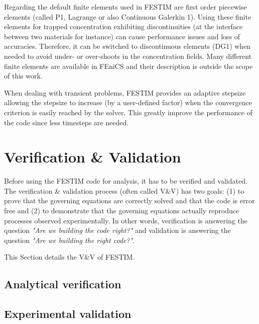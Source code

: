 Regarding the default finite elements used in FESTIM are first order piecewise elements (called P1, Lagrange or also Continuous Galerkin 1).
Using these finite elements for trapped concentration exhibiting discontinuities (at the interface between two materials for instance) can cause performance issues and loss of accuracies.
Therefore, it can be switched to discontinuous elements (DG1) when needed to avoid under- or over-shoots in the concentration fields.
Many different finite elements are available in FEniCS \cite{noauthor_periodic_nodate} and their description is outside the scope of this work.

When dealing with transient problems, FESTIM provides an adaptive stepsize allowing the stepsize to increase (by a user-defined factor) when the convergence criterion is easily reached by the solver.
This greatly improve the performance of the code since less timesteps are needed.



\section{Verification \& Validation}

Before using the FESTIM code for analysis, it has to be verified and validated.
The verification \& validation process (often called V\&V) has two goals: (1) to prove that the governing equations are correctly solved and that the code is error free and (2) to demonstrate that the governing equations actually reproduce processes observed experimentally.
In other words, verification is answering the question \textit{"Are we building the code right?"} and validation is answering the question \textit{"Are we building the right code?"}.

This Section details the V\&V of FESTIM.

\subsection{Analytical verification}



\subsection{Experimental validation}



